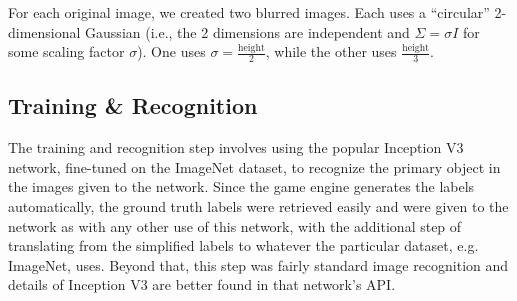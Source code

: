 For each original image, we created two blurred images. Each uses a ``circular''
2-dimensional Gaussian (i.e., the 2 dimensions are independent and \(\Sigma =
\sigma I\) for some scaling factor \(\sigma\)). One uses \(\sigma =
\frac{\text{height}}{2}\), while the other uses \(\frac{\text{height}}{3}\).
\vspace{-1em}
\subsection{Training \& Recognition}
The training and recognition step involves using the popular Inception V3
network, fine-tuned on the ImageNet dataset, to recognize the primary object in the images given to the network.
Since the game engine generates the labels automatically, the ground truth
labels were retrieved easily and were given to the network as with any other use
of this network, with the additional step of translating from the simplified labels to whatever the particular dataset, e.g. ImageNet, uses. Beyond that, this step was fairly standard image recognition and
details of Inception V3 are better found in that network's API\@.
